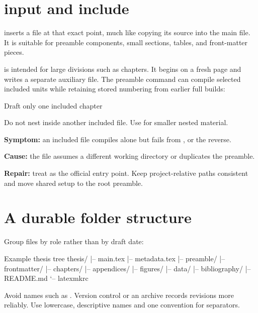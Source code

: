 \section{input and include}

 inserts a file at that exact point, much like
copying its source into the main file. It is suitable for preamble components,
small sections, tables, and front-matter pieces.

 is intended for large divisions such as chapters.
It begins on a fresh page and writes a separate auxiliary file. The preamble
command  can compile selected included units while retaining
stored numbering from earlier full builds:

\begin{latexcode}{Draft only one included chapter}

\end{latexcode}

Do not nest  inside another included file. Use  for
smaller nested material.

\begin{commonerror}
\textbf{Symptom:} an included file compiles alone but fails from
, or the reverse.

\textbf{Cause:} the file assumes a different working directory or duplicates
the preamble.

\textbf{Repair:} treat  as the official entry point. Keep
project-relative paths consistent and move shared setup to the root preamble.
\end{commonerror}

\section{A durable folder structure}

Group files by role rather than by draft date:

\begin{terminalcode}{Example thesis tree}
thesis/
|-- main.tex
|-- metadata.tex
|-- preamble/
|-- frontmatter/
|-- chapters/
|-- appendices/
|-- figures/
|-- data/
|-- bibliography/
|-- README.md
`-- latexmkrc
\end{terminalcode}

Avoid names such as . Version control or an
archive records revisions more reliably. Use lowercase, descriptive names and
one convention for separators.

